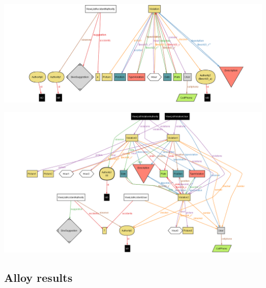 \includegraphics[width=\textwidth]{Images/AlloyWorlds/World3.png}

\vspace{1cm}



\vspace{0.5cm}

\includegraphics[width=\textwidth]{Images/AlloyWorlds/World4.png}

\newpage

\subsection{\LARGE {Alloy results}}

